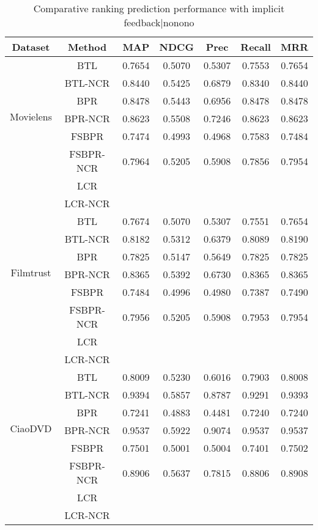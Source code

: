 \documentclass[letterpaper]{article} %
\begin{document}
\begin{table}[htp]
\tiny
\caption{Comparative ranking prediction performance with implicit feedback|nonono}
\begin{center}
\begin{tabular}{|c|c|c|c|c|c|c|}
\hline
Dataset & Method & MAP & NDCG & Prec & Recall & MRR \\\hline
\multirow{6}{*}{Movielens} & BTL &0.7654 &0.5070 &0.5307 &0.7553 &0.7654 \\\cline{2-7}
 & BTL-NCR &0.8440 &0.5425 &0.6879 &0.8340 &0.8440 \\\cline{2-7}
 & BPR &0.8478 &0.5443 &0.6956 &0.8478 &0.8478 \\\cline{2-7}
 & BPR-NCR &0.8623 &0.5508 &0.7246 &0.8623 &0.8623 \\\cline{2-7}
 & FSBPR &0.7474 &0.4993 &0.4968 &0.7583 &0.7484 \\\cline{2-7}
  & FSBPR-NCR &0.7964 &0.5205 &0.5908 &0.7856 &0.7954 \\\cline{2-7}
   & LCR & & & & & \\\cline{2-7}
 & LCR-NCR & & & & & \\\hline
\multirow{6}{*}{Filmtrust} & BTL &0.7674 &0.5070 &0.5307 &0.7551 &0.7654 \\\cline{2-7}
 & BTL-NCR &0.8182 &0.5312 &0.6379 &0.8089 &0.8190 \\\cline{2-7}
 & BPR &0.7825 &0.5147 &0.5649 &0.7825 &0.7825  \\\cline{2-7}
 & BPR-NCR &0.8365 &0.5392 &0.6730 &0.8365 &0.8365 \\\cline{2-7}
 & FSBPR &0.7484 &0.4996 &0.4980 &0.7387 &0.7490 \\\cline{2-7}
  & FSBPR-NCR &0.7956 &0.5205 &0.5908 &0.7953 &0.7954 \\\cline{2-7}
   & LCR & & & & & \\\cline{2-7}
 & LCR-NCR & & & & & \\\hline
\multirow{6}{*}{CiaoDVD} & BTL &0.8009 &0.5230 &0.6016 &0.7903 &0.8008 \\\cline{2-7}
 & BTL-NCR &0.9394 &0.5857 &0.8787 &0.9291 &0.9393 \\\cline{2-7}
 & BPR &0.7241 &0.4883 &0.4481 &0.7240 &0.7240 \\\cline{2-7}
 & BPR-NCR &0.9537 &0.5922 &0.9074 &0.9537 &0.9537 \\\cline{2-7}
 & FSBPR &0.7501 &0.5001 &0.5004 &0.7401 &0.7502 \\\cline{2-7}
  & FSBPR-NCR &0.8906 &0.5637 &0.7815 &0.8806 &0.8908 \\\cline{2-7}
   & LCR & & & & & \\\cline{2-7}
 & LCR-NCR & & & & & \\\hline
\end{tabular}
\end{center}
\label{tab:ratingresult}
\end{table}%
\end{document}
